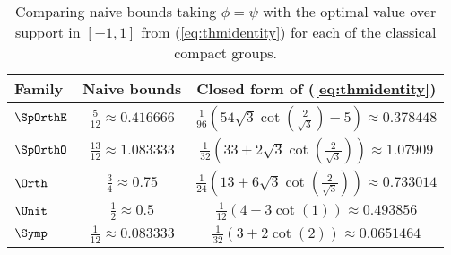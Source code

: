 \documentclass[12pt, reqno]{amsart}
\numberwithin{equation}{section}
\theoremstyle{definition}
\theoremstyle{remark}
\begin{document}
\begin{table}[h]
	\begin{center}
		\begin{tabular}{|l||c|c|}
			\hline
			\textbf{Family} & \textbf{Naive bounds} & \textbf{Closed form of (\ref{eq:thmidentity})} \\ \hline
			$\SpOrthE$ & $\frac{5}{12} \approx 0.416666$ & $\frac{1}{96} \left(54 \sqrt{3} \cot \left(\frac{2}{\sqrt{3}}\right)-5\right) \approx 0.378448$ \\\hline
			$\SpOrthO$ & $\frac{13}{12} \approx 1.083333$ & $\frac{1}{32} \left(33+2 \sqrt{3} \cot \left(\frac{2}{\sqrt{3}}\right)\right) \approx 1.07909$ \\
			\hline
			$\Orth$ & $\frac34 \approx 0.75$ & $\frac{1}{24} \left(13+6 \sqrt{3} \cot \left(\frac{2}{\sqrt{3}}\right)\right)\approx 0.733014 $\\\hline
			$\Unit$ & $\frac12 \approx 0.5$ & $\frac{1}{12} (4+3 \cot (1)) \approx 0.493856$\\\hline
			$\Symp$ & $\frac{1}{12} \approx 0.083333$ & $\frac{1}{32} (3+2 \cot (2)) \approx 0.0651464$\\\hline
		\end{tabular}
		\caption{Comparing naive bounds taking $\phi = \psi$ with the optimal value over support in $[-1, 1]$ from (\ref{eq:thmidentity}) for each of the classical compact groups.} \label{tab:bounds}
	\end{center}
\end{table}

\end{document}
